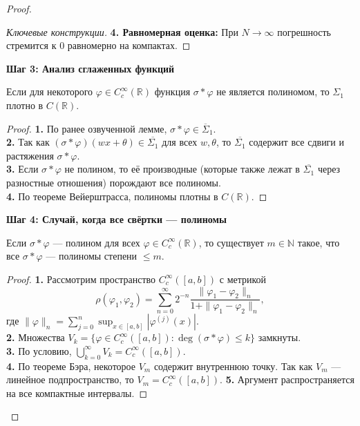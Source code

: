 \documentclass[../NDCNNAI_main.tex]{subfiles}
\begin{document}
\begin{proof}
\begin{proof}[Ключевые конструкции]
\textbf{4. Равномерная оценка:} При $N \to \infty$ погрешность стремится к 0 равномерно на компактах.
\end{proof}

\noindent
\textbf{Шаг 3: Анализ сглаженных функций}

\begin{lemma}
Если для некоторого $\varphi \in C^\infty_c(\mathbb{R})$ функция $\sigma * \varphi$ не является полиномом, то $\Sigma_1$ плотно в $C(\mathbb{R})$.
\end{lemma}

\begin{proof}
\textbf{1.} По ранее озвученной лемме, $\sigma * \varphi \in \overline{\Sigma}_1$.\\
\textbf{2.} Так как $(\sigma * \varphi)(wx + \theta) \in \overline{\Sigma_1}$ для всех $w, \theta$, то $\overline{\Sigma_1}$ содержит все сдвиги и растяжения $\sigma * \varphi$.\\
\textbf{3.} Если $\sigma * \varphi$ не полином, то её производные (которые также лежат в $\overline{\Sigma_1}$ через разностные отношения) порождают все полиномы.\\
\textbf{4.} По теореме Вейерштрасса, полиномы плотны в $C(\mathbb{R})$.
\end{proof}

\noindent
\textbf{Шаг 4: Случай, когда все свёртки --- полиномы}

\begin{lemma}
Если $\sigma * \varphi$ --- полином для всех $\varphi \in C^\infty_c(\mathbb{R})$, то существует $m \in \mathbb{N}$ такое, что все $\sigma * \varphi$ --- полиномы степени $\leq m$.
\end{lemma}

\begin{proof}
\textbf{1.} Рассмотрим пространство $C^\infty_c([a,b])$ с метрикой
\[
\rho(\varphi_1, \varphi_2) = \sum_{n=0}^\infty 2^{-n} \frac{\|\varphi_1 - \varphi_2\|_n}{1 + \|\varphi_1 - \varphi_2\|_n},
\]
где $\|\varphi\|_n = \sum_{j=0}^n \sup_{x \in [a,b]} |\varphi^{(j)}(x)|$.\\
\textbf{2.} Множества $V_k = \{\varphi \in C^\infty_c([a,b])\colon \deg(\sigma * \varphi) \leq k\}$ замкнуты.\\
\textbf{3.} По условию, $\bigcup_{k=0}^\infty V_k = C^\infty_c([a,b])$.\\
\textbf{4.} По теореме Бэра, некоторое $V_m$ содержит внутреннюю точку. Так как $V_m$ --- линейное подпространство, то $V_m = C^\infty_c([a,b])$.
\textbf{5.} Аргумент распространяется на все компактные интервалы.
\end{proof}


\end{proof}
\end{document}
